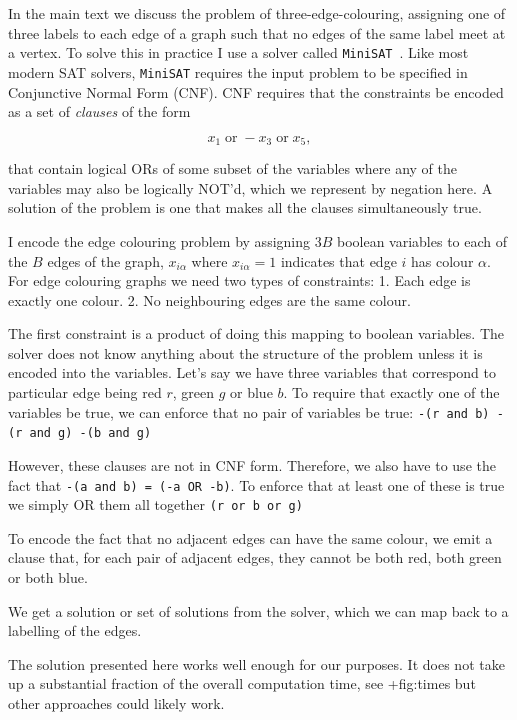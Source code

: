 In the main text we discuss the problem of three-edge-colouring, assigning one of three labels to each edge of a graph such that no edges of the same label meet at a vertex. To solve this in practice I use a solver called \passthrough{\lstinline!MiniSAT!}~\autocite{imms-sat18}. Like most modern SAT solvers, \passthrough{\lstinline!MiniSAT!} requires the input problem to be specified in Conjunctive Normal Form (CNF). CNF requires that the constraints be encoded as a set of \emph{clauses} of the form

\[x_1 \;\textrm{or}\; -x_3 \;\textrm{or}\; x_5,\]

that contain logical ORs of some subset of the variables where any of the variables may also be logically NOT'd, which we represent by negation here. A solution of the problem is one that makes all the clauses simultaneously true.

I encode the edge colouring problem by assigning \(3B\) boolean variables to each of the \(B\) edges of the graph, \(x_{i\alpha}\) where \(x_{i\alpha} = 1\) indicates that edge \(i\) has colour \(\alpha\). For edge colouring graphs we need two types of constraints: 1. Each edge is exactly one colour. 2. No neighbouring edges are the same colour.

The first constraint is a product of doing this mapping to boolean variables. The solver does not know anything about the structure of the problem unless it is encoded into the variables. Let's say we have three variables that correspond to particular edge being red \(r\), green \(g\) or blue \(b\). To require that exactly one of the variables be true, we can enforce that no pair of variables be true: \passthrough{\lstinline!-(r and b) -(r and g) -(b and g)!}

However, these clauses are not in CNF form. Therefore, we also have to use the fact that \passthrough{\lstinline!-(a and b) = (-a OR -b)!}. To enforce that at least one of these is true we simply OR them all together \passthrough{\lstinline!(r or b or g)!}

To encode the fact that no adjacent edges can have the same colour, we emit a clause that, for each pair of adjacent edges, they cannot be both red, both green or both blue.

We get a solution or set of solutions from the solver, which we can map back to a labelling of the edges.

The solution presented here works well enough for our purposes. It does not take up a substantial fraction of the overall computation time, see +fig:times but other approaches could likely work.

